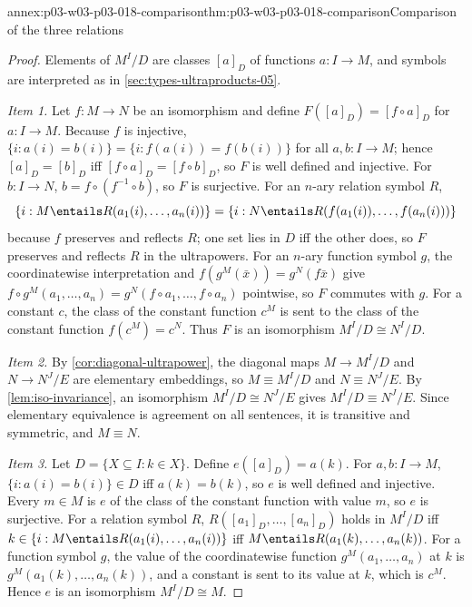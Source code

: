 \begin{annexitem}{annex:p03-w03-p03-018-comparison}{thm:p03-w03-p03-018-comparison}{Comparison of the three relations}
\begin{proof}
Elements of \(M^I/D\) are classes \([a]_D\) of functions \(a:I\to M\), and
symbols are interpreted as in \cref{sec:types-ultraproducts-05}.

\emph{Item 1.}  Let \(f:M\to N\) be an isomorphism and define
\(F([a]_D)=[f\circ a]_D\) for \(a:I\to M\).  Because \(f\) is injective,
\(\{i:a(i)=b(i)\}=\{i:f(a(i))=f(b(i))\}\) for all \(a,b:I\to M\); hence
\([a]_D=[b]_D\) iff \([f\circ a]_D=[f\circ b]_D\), so \(F\) is well defined
and injective.  For \(b:I\to N\), \(b=f\circ(f^{-1}\circ b)\), so \(F\) is
surjective.  For an \(n\)-ary relation symbol \(R\),
\[
  \{i:M\entails R(a_1(i),\ldots,a_n(i))\}
  =\{i:N\entails R(f(a_1(i)),\ldots,f(a_n(i)))\}
\]
because \(f\) preserves and reflects \(R\); one set lies in \(D\) iff the
other does, so \(F\) preserves and reflects \(R\) in the ultrapowers.  For an
\(n\)-ary function symbol \(g\), the coordinatewise interpretation and
\(f(g^M(\bar x))=g^N(f\bar x)\) give
\(f\circ g^M(a_1,\ldots,a_n)=g^N(f\circ a_1,\ldots,f\circ a_n)\) pointwise,
so \(F\) commutes with \(g\).  For a constant \(c\), the class of the
constant function \(c^M\) is sent to the class of the constant function
\(f(c^M)=c^N\).  Thus \(F\) is an isomorphism \(M^I/D\cong N^I/D\).

\emph{Item 2.}  By \cref{cor:diagonal-ultrapower}, the diagonal maps
\(M\to M^I/D\) and \(N\to N^J/E\) are elementary embeddings, so
\(M\equiv M^I/D\) and \(N\equiv N^J/E\).  By \cref{lem:iso-invariance}, an
isomorphism \(M^I/D\cong N^J/E\) gives \(M^I/D\equiv N^J/E\).  Since
elementary equivalence is agreement on all sentences, it is transitive and
symmetric, and \(M\equiv N\).

\emph{Item 3.}  Let \(D=\{X\subseteq I:k\in X\}\).  Define
\(e([a]_D)=a(k)\).  For \(a,b:I\to M\), \(\{i:a(i)=b(i)\}\in D\) iff
\(a(k)=b(k)\), so \(e\) is well defined and injective.  Every \(m\in M\) is
\(e\) of the class of the constant function with value \(m\), so \(e\) is
surjective.  For a relation symbol \(R\),
\(R([a_1]_D,\ldots,[a_n]_D)\) holds in \(M^I/D\) iff
\(k\in\{i:M\entails R(a_1(i),\ldots,a_n(i))\}\) iff
\(M\entails R(a_1(k),\ldots,a_n(k))\).  For a function symbol \(g\), the
value of the coordinatewise function \(g^M(a_1,\ldots,a_n)\) at \(k\) is
\(g^M(a_1(k),\ldots,a_n(k))\), and a constant is sent to its value at \(k\),
which is \(c^M\).  Hence \(e\) is an isomorphism \(M^I/D\cong M\).


\end{proof}
\end{annexitem}
